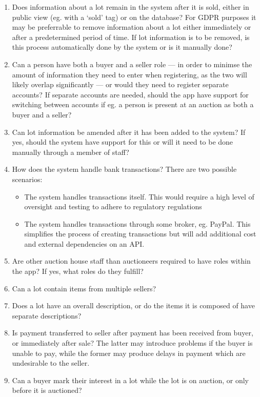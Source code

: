\documentclass[titlepage, 12pt]{extarticle}
\begin{document}
\begin{enumerate}
\item Does information about a lot remain in the system after it is sold, either in public view (eg. with a `sold' tag) or on the database? For GDPR purposes it may be preferrable to remove information about a lot either immediately or after a predetermined period of time. If lot information is to be removed, is this process automatically done by the system or is it manually done?
\item Can a person have both a buyer and a seller role --- in order to minimse the amount of information they need to enter when registering, as the two will likely overlap significantly --- or would they need to register separate accounts? If separate accounts are needed, should the app have support for switching between accounts if eg. a person is present at an auction as both a buyer and a seller?
\item Can lot information be amended after it has been added to the system? If yes, should the system have support for this or will it need to be done manually through a member of staff?
\item How does the system handle bank transactions? There are two possible scenarios:
  \begin{itemize}
  \item The system handles transactions itself. This would require a high level of oversight and testing to adhere to regulatory regulations
  \item The system handles transactions through some broker, eg. PayPal. This simplifies the process of creating transactions but will add additional cost and external dependencies on an API. 
  \end{itemize}
\item Are other auction house staff than auctioneers required to have roles within the app? If yes, what roles do they fulfill?
\item Can a lot contain items from multiple sellers? 
\item Does a lot have an overall description, or do the items it is composed of have separate descriptions?
\item Is payment transferred to seller after payment has been received from buyer, or immediately after sale? The latter may introduce problems if the buyer is unable to pay, while the former may produce delays in payment which are undesirable to the seller.
\item Can a buyer mark their interest in a lot while the lot is on auction, or only before it is auctioned?
\end{enumerate}
\end{document}
